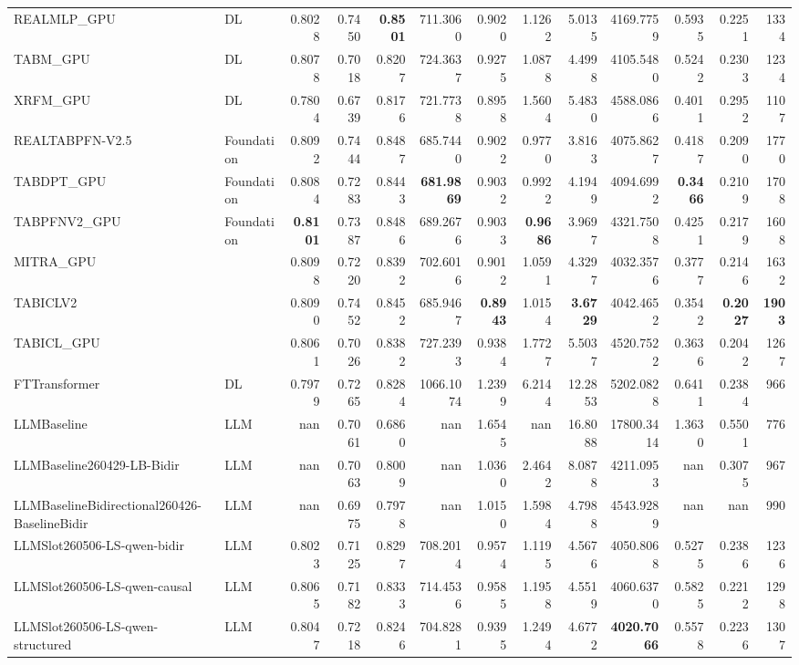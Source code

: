 \begin{table}[htbp]
{\begin{tabular}{ll|rrrrrrrrrr|r}
REALMLP\_GPU & DL & 0.8028 & 0.7450 & \textbf{0.8501} & 711.3060 & 0.9020 & 1.1262 & 5.0135 & 4169.7759 & 0.5935 & 0.2251 & 1334 \\
TABM\_GPU & DL & 0.8078 & 0.7018 & 0.8207 & 724.3637 & 0.9275 & 1.0878 & 4.4998 & 4105.5480 & 0.5242 & 0.2303 & 1234 \\
XRFM\_GPU & DL & 0.7804 & 0.6739 & 0.8176 & 721.7738 & 0.8958 & 1.5604 & 5.4830 & 4588.0866 & 0.4011 & 0.2952 & 1107 \\
REALTABPFN-V2.5 & Foundation & 0.8092 & 0.7444 & 0.8487 & 685.7440 & 0.9022 & 0.9770 & 3.8163 & 4075.8627 & 0.4187 & 0.2090 & 1770 \\
TABDPT\_GPU & Foundation & 0.8084 & 0.7283 & 0.8443 & \textbf{681.9869} & 0.9032 & 0.9922 & 4.1949 & 4094.6992 & \textbf{0.3466} & 0.2109 & 1708 \\
TABPFNV2\_GPU & Foundation & \textbf{0.8101} & 0.7387 & 0.8486 & 689.2676 & 0.9033 & \textbf{0.9686} & 3.9697 & 4321.7508 & 0.4251 & 0.2179 & 1608 \\
MITRA\_GPU &  & 0.8098 & 0.7220 & 0.8392 & 702.6016 & 0.9012 & 1.0591 & 4.3297 & 4032.3576 & 0.3777 & 0.2146 & 1632 \\
TABICLV2 &  & 0.8090 & 0.7452 & 0.8452 & 685.9467 & \textbf{0.8943} & 1.0154 & \textbf{3.6729} & 4042.4652 & 0.3542 & \textbf{0.2027} & \textbf{1903} \\
TABICL\_GPU &  & 0.8061 & 0.7026 & 0.8382 & 727.2393 & 0.9384 & 1.7727 & 5.5037 & 4520.7522 & 0.3636 & 0.2042 & 1267 \\
\midrule
FTTransformer & DL & 0.7979 & 0.7265 & 0.8284 & 1066.1074 & 1.2399 & 6.2144 & 12.2853 & 5202.0828 & 0.6411 & 0.2384 & 966 \\
LLMBaseline & LLM & nan & 0.7061 & 0.6860 & nan & 1.6545 & nan & 16.8088 & 17800.3414 & 1.3630 & 0.5501 & 776 \\
LLMBaseline260429-LB-Bidir & LLM & nan & 0.7063 & 0.8009 & nan & 1.0360 & 2.4642 & 8.0878 & 4211.0953 & nan & 0.3075 & 967 \\
LLMBaselineBidirectional260426-BaselineBidir & LLM & nan & 0.6975 & 0.7978 & nan & 1.0150 & 1.5984 & 4.7988 & 4543.9289 & nan & nan & 990 \\
LLMSlot260506-LS-qwen-bidir & LLM & 0.8023 & 0.7125 & 0.8297 & 708.2014 & 0.9574 & 1.1195 & 4.5676 & 4050.8068 & 0.5275 & 0.2386 & 1236 \\
LLMSlot260506-LS-qwen-causal & LLM & 0.8065 & 0.7182 & 0.8333 & 714.4536 & 0.9585 & 1.1958 & 4.5519 & 4060.6370 & 0.5825 & 0.2212 & 1298 \\
LLMSlot260506-LS-qwen-structured & LLM & 0.8047 & 0.7218 & 0.8246 & 704.8281 & 0.9395 & 1.2494 & 4.6772 & \textbf{4020.7066} & 0.5578 & 0.2236 & 1307 \\

\end{tabular}}
\end{table}
